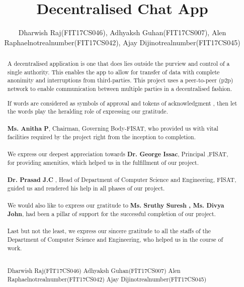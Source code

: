 \documentclass{fisatproject}
\title{Decentralised Chat App}
\author{Dharwish Raj(FIT17CS046), Adhyaksh Guhan(FIT17CS007), Alen Raphaelnotrealnumber(FIT17CS042), Ajay Dijinotrealnumber(FIT17CS045)}
\begin{document}
\maketitle

\makecert

\newpage
\setcounter{page}{1}
\renewcommand\abstractname{ABSTRACT}
\begin{abstract}
\vspace{5cm}
A decentralised application is one that does lies outside the purview and control of a single authority. This enables the app to allow for transfer of data with complete anonimity and interruptions from third-parties. This project uses a peer-to-peer (p2p) network to enable communication between multiple parties in a decentralised fashion.
\end{abstract}


\newpage
\renewcommand\abstractname{ACKNOWLEDGMENT}
\begin{abstract}
\vspace{5cm}
If words are considered as symbols of approval and tokens of acknowledgment , then let the words play the heralding role of expressing our gratitude. \\ \\
 \textbf{Ms. Anitha P}, Chairman, Governing Body-FISAT, who provided us with vital facilities required by the project right from the inception to completion. \\ \\
 We express our deepest appreciation towards \textbf{Dr. George Issac}, Principal ,FISAT, for providing amenities, which helped us in the fulfillment of our project. \\ \\
 \textbf{Dr. Prasad J.C} , Head of Department of Computer Science and Engineering, FISAT, guided us  and rendered his help in all phases of our project. \\ \\
 We would also like to express our gratitude to \textbf{Ms. Sruthy Suresh , Ms. Divya John}, had been a pillar of support for the successful completion of our project. \\ \\
 Last but not the least, we express our sincere gratitude to all the staffs of the Department of Computer Science  and Engineering, who helped us in the course of work. \\ \\

\vspace{1cm}
\begin{flushright}
Dharwish Raj(FIT17CS046)
Adhyaksh Guhan(FIT17CS007)
Alen Raphaelnotrealnumber(FIT17CS042)
Ajay Dijinotrealnumber(FIT17CS045)
\end{flushright}
\end{abstract}
\newpage
\end{document}

